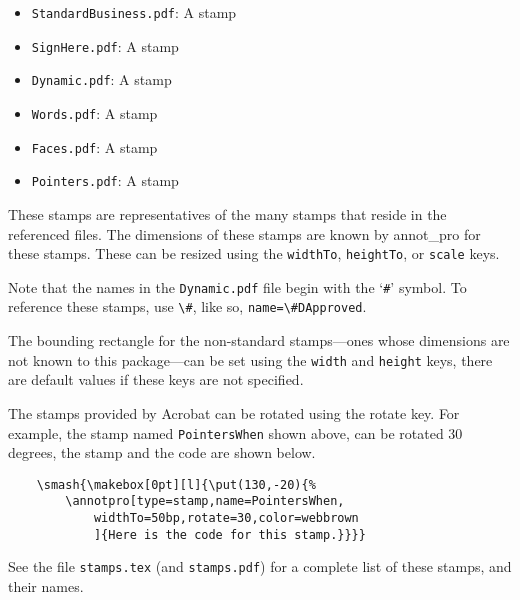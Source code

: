 \documentclass{article}
\begin{document}
\begin{itemize}
\item  \texttt{StandardBusiness.pdf}: A  stamp
\item  \texttt{SignHere.pdf}: A  stamp
\item  \texttt{Dynamic.pdf}: A  stamp
\item  \texttt{Words.pdf}: A  stamp
\item  \texttt{Faces.pdf}: A  stamp
\item  \texttt{Pointers.pdf}: A  stamp
\end{itemize}
These stamps are representatives of the many stamps that reside in the referenced files. The dimensions of these
stamps are known by \textsf{annot\_pro} for these stamps. These can be resized using the \texttt{widthTo}, \texttt{heightTo}, or \texttt{scale}
keys.

Note that the names in the \texttt{Dynamic.pdf} file begin with the `\texttt{\#}' symbol. To reference these stamps, use
\verb!\#!, like so, \verb!name=\#DApproved!.

The bounding rectangle for the non-standard stamps---ones whose
dimensions are not known to this package---can be set using the
\texttt{width} and \texttt{height} keys, there are default values if
these keys are not specified.

The stamps provided by Acrobat can be rotated using the rotate key. For example, the stamp named
\texttt{PointersWhen} shown above, can be rotated 30 degrees, the stamp and the code are shown below.
\begin{verbatim}
    \smash{\makebox[0pt][l]{\put(130,-20){%
        \annotpro[type=stamp,name=PointersWhen,
            widthTo=50bp,rotate=30,color=webbrown
            ]{Here is the code for this stamp.}}}}
\end{verbatim}
See the file \texttt{stamps.tex} (and \texttt{stamps.pdf}) for a
complete list of these stamps, and their names.
\end{document}
